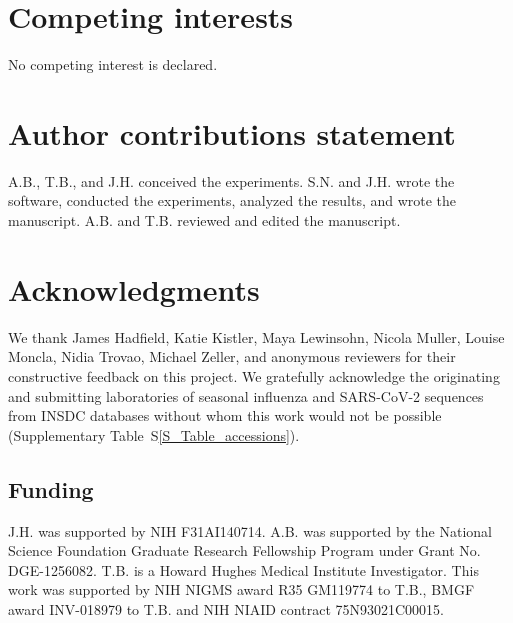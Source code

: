 \documentclass[webpdf,contemporary,large,single]{oup-authoring-template}%
\theoremstyle{thmstyleone}%
\theoremstyle{thmstyletwo}%
\theoremstyle{thmstylethree}%
\begin{document}
\section*{Competing interests}

No competing interest is declared.

\section*{Author contributions statement}

A.B., T.B., and J.H. conceived the experiments.
S.N. and J.H. wrote the software, conducted the experiments, analyzed the results, and wrote the manuscript.
A.B. and T.B. reviewed and edited the manuscript.

\section*{Acknowledgments}

We thank James Hadfield, Katie Kistler, Maya Lewinsohn, Nicola Muller, Louise Moncla, Nidia Trovao, Michael Zeller, and anonymous reviewers for their constructive feedback on this project.
We gratefully acknowledge the originating and submitting laboratories of seasonal influenza and SARS-CoV-2 sequences from INSDC databases without whom this work would not be possible (Supplementary Table~S\ref{S_Table_accessions}).

\subsection*{Funding}

J.H. was supported by NIH F31AI140714.
A.B. was supported by the National Science Foundation Graduate Research Fellowship Program under Grant No.
DGE-1256082.
T.B. is a Howard Hughes Medical Institute Investigator.
This work was supported by NIH NIGMS award R35 GM119774 to T.B., BMGF award INV-018979 to T.B. and NIH NIAID contract 75N93021C00015.

\nolinenumbers
\end{document}
